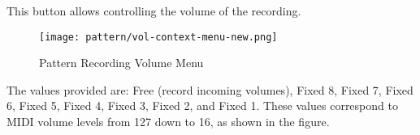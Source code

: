   This button allows controlling the volume of the recording.

\begin{figure}[H]
   \centering 
   \texttt{[image: pattern/vol-context-menu-new.png]}
   \caption{Pattern Recording Volume Menu}
   \label{fig:pattern_edit_recording_volume_menu}
\end{figure}

   The values provided are:
   Free (record incoming volumes),
   Fixed 8, Fixed 7, Fixed 6, Fixed 5, Fixed 4, Fixed 3,
   Fixed 2, and Fixed 1.
   These values correspond to MIDI volume levels from 127 down to 16, as
   shown in the figure.

